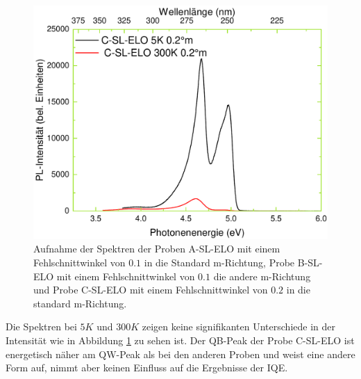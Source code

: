 \begin{figure}[htb]
\begin{minipage}[t]{0.4\textwidth}
    \includegraphics[width=\linewidth]{Bilder/TS4048/cslelo.pdf}
  \end{minipage}
	\caption{Aufnahme der Spektren der Proben A-SL-ELO mit einem Fehlschnittwinkel von $0.1$ in die Standard m-Richtung, Probe B-SL-ELO mit einem Fehlschnittwinkel von $0.1$ die andere m-Richtung und Probe C-SL-ELO mit einem Fehlschnittwinkel von $0.2$ in die standard m-Richtung. }
	\label{fig:spectrassl}
\end{figure}
\noindent 
%
Die Spektren bei $5K$ und $300K$ zeigen keine signifikanten Unterschiede in der Intensität wie in Abbildung \ref{fig:spectrassl} zu sehen ist. Der QB-Peak der Probe C-SL-ELO ist energetisch näher am QW-Peak als bei den anderen Proben und weist eine andere Form auf, nimmt aber keinen Einfluss auf die Ergebnisse der IQE. 
%
